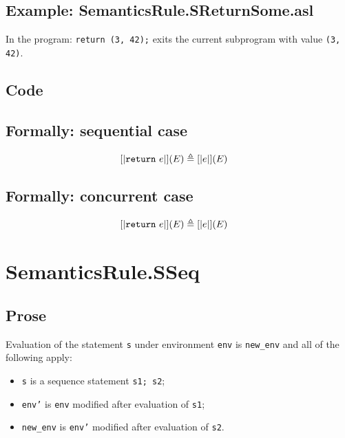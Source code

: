 \documentclass{book}
\begin{document}
    \subsection{Example: SemanticsRule.SReturnSome.asl}
    In the program:
    \texttt{return (3, 42);} exits the current subprogram with value \texttt{(3, 42)}.

  \subsection{Code}

\begin{formal}
  \subsection{Formally: sequential case}
  \begin{align}
  \left[| \mathtt{return}\ e \right|] (E) & \triangleq \left[| e \right|] (E)
  \label{eq:sem-seq-sreturn}
  \end{align}

  \subsection{Formally: concurrent case}
  \begin{align}
  \left[| \mathtt{return}\ e \right|] (E) & \triangleq \left[| e \right|] (E)
  \label{eq:sem-conc-sreturn}
  \end{align}
\end{formal}


\section{SemanticsRule.SSeq \label{sec:SemanticsRule.SSeq}}

  \subsection{Prose}
  Evaluation of the statement \texttt{s} under environment \texttt{env} is
\texttt{new\_env} and all of the following apply:
  \begin{itemize}
  \item \texttt{s} is a sequence statement \texttt{s1; s2};
  \item \texttt{env'} is \texttt{env} modified after evaluation of \texttt{s1};
  \item \texttt{new\_env} is \texttt{env'} modified after evaluation of \texttt{s2}.
  \end{itemize}
\end{document}
